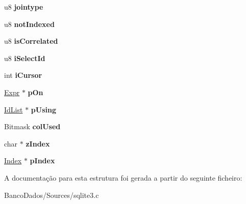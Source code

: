 \begin{DoxyCompactItemize}
\item 
\hypertarget{struct_src_list_1_1_src_list__item_a36193fe4914ddc86222e5c70d9639a00}{u8 {\bfseries jointype}}\label{struct_src_list_1_1_src_list__item_a36193fe4914ddc86222e5c70d9639a00}

\item 
\hypertarget{struct_src_list_1_1_src_list__item_a4465537a30765604006ec58f0fcc3a56}{u8 {\bfseries not\-Indexed}}\label{struct_src_list_1_1_src_list__item_a4465537a30765604006ec58f0fcc3a56}

\item 
\hypertarget{struct_src_list_1_1_src_list__item_add716d86abd97e27b4a2da16f4918f9e}{u8 {\bfseries is\-Correlated}}\label{struct_src_list_1_1_src_list__item_add716d86abd97e27b4a2da16f4918f9e}

\item 
\hypertarget{struct_src_list_1_1_src_list__item_a099cfe9b7559b42c49dda02e57188738}{u8 {\bfseries i\-Select\-Id}}\label{struct_src_list_1_1_src_list__item_a099cfe9b7559b42c49dda02e57188738}

\item 
\hypertarget{struct_src_list_1_1_src_list__item_af2e8aae90bd7a00b814db5a2d31f6607}{int {\bfseries i\-Cursor}}\label{struct_src_list_1_1_src_list__item_af2e8aae90bd7a00b814db5a2d31f6607}

\item 
\hypertarget{struct_src_list_1_1_src_list__item_a525f683af2ffa8f094d941a5a4972720}{\hyperlink{struct_expr}{Expr} $\ast$ {\bfseries p\-On}}\label{struct_src_list_1_1_src_list__item_a525f683af2ffa8f094d941a5a4972720}

\item 
\hypertarget{struct_src_list_1_1_src_list__item_a38ecf205dcaebad098b73c56e48ba944}{\hyperlink{struct_id_list}{Id\-List} $\ast$ {\bfseries p\-Using}}\label{struct_src_list_1_1_src_list__item_a38ecf205dcaebad098b73c56e48ba944}

\item 
\hypertarget{struct_src_list_1_1_src_list__item_a4fd7e7e26995048b58006d020e8c48d6}{Bitmask {\bfseries col\-Used}}\label{struct_src_list_1_1_src_list__item_a4fd7e7e26995048b58006d020e8c48d6}

\item 
\hypertarget{struct_src_list_1_1_src_list__item_a72b8e117712e49607b770a462fb42d95}{char $\ast$ {\bfseries z\-Index}}\label{struct_src_list_1_1_src_list__item_a72b8e117712e49607b770a462fb42d95}

\item 
\hypertarget{struct_src_list_1_1_src_list__item_ab4722e97bd4852c8b84e620185955c28}{\hyperlink{struct_index}{Index} $\ast$ {\bfseries p\-Index}}\label{struct_src_list_1_1_src_list__item_ab4722e97bd4852c8b84e620185955c28}

\end{DoxyCompactItemize}


A documentação para esta estrutura foi gerada a partir do seguinte ficheiro\-:\begin{DoxyCompactItemize}
\item 
Banco\-Dados/\-Sources/sqlite3.\-c\end{DoxyCompactItemize}
